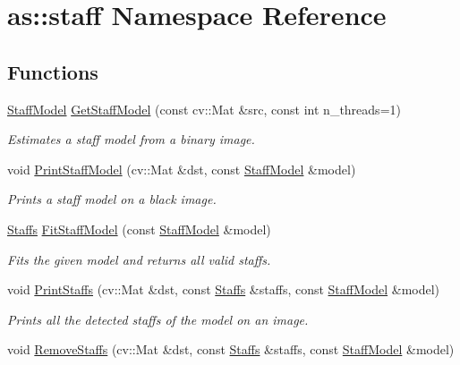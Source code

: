 \hypertarget{namespaceas_1_1staff}{}\section{as\+:\+:staff Namespace Reference}
\label{namespaceas_1_1staff}
\subsection*{Functions}
\begin{DoxyCompactItemize}
\item 
\hyperlink{structStaffModel}{Staff\+Model} \hyperlink{namespaceas_1_1staff_adc528d054888cbe3b9da25286da8aef6}{Get\+Staff\+Model} (const cv\+::\+Mat \&src, const int n\+\_\+threads=1)
\begin{DoxyCompactList}\small\item\em Estimates a staff model from a binary image. \end{DoxyCompactList}\item 
void \hyperlink{namespaceas_1_1staff_a9c48cfcf1c17cad08ed233fe90d05839}{Print\+Staff\+Model} (cv\+::\+Mat \&dst, const \hyperlink{structStaffModel}{Staff\+Model} \&model)
\begin{DoxyCompactList}\small\item\em Prints a staff model on a black image. \end{DoxyCompactList}\item 
\hyperlink{staff_8hh_acfffa1dd2bf9ce5820435e63446a7c90}{Staffs} \hyperlink{namespaceas_1_1staff_a8a53d0c0106d677e72ae36edb5bbd760}{Fit\+Staff\+Model} (const \hyperlink{structStaffModel}{Staff\+Model} \&model)
\begin{DoxyCompactList}\small\item\em Fits the given model and returns all valid staffs. \end{DoxyCompactList}\item 
void \hyperlink{namespaceas_1_1staff_a5209861cdb891c8a12b5ef43784fac77}{Print\+Staffs} (cv\+::\+Mat \&dst, const \hyperlink{staff_8hh_acfffa1dd2bf9ce5820435e63446a7c90}{Staffs} \&staffs, const \hyperlink{structStaffModel}{Staff\+Model} \&model)
\begin{DoxyCompactList}\small\item\em Prints all the detected staffs of the model on an image. \end{DoxyCompactList}\item 
void \hyperlink{namespaceas_1_1staff_ae06eef6c527f2a2919cc8344394fc80c}{Remove\+Staffs} (cv\+::\+Mat \&dst, const \hyperlink{staff_8hh_acfffa1dd2bf9ce5820435e63446a7c90}{Staffs} \&staffs, const \hyperlink{structStaffModel}{Staff\+Model} \&model)

\end{DoxyCompactItemize}
